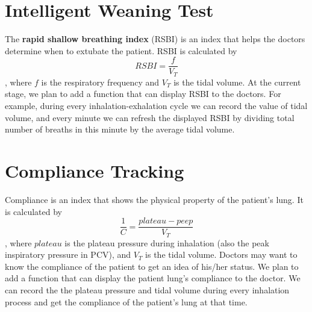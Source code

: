 \documentclass{article}
\begin{document}
\section{Intelligent Weaning Test}
The \textbf{rapid shallow breathing index} (RSBI) is an index that helps the doctors determine when to extubate the patient. RSBI is calculated by
$$RSBI=\frac{f}{V_T}$$, where $f$ is the respiratory frequency and $V_T$ is the tidal volume. At the current stage, we plan to add a function that can display RSBI to the doctors. For example, during every inhalation-exhalation cycle we can record the value of tidal volume, and every minute we can refresh the displayed RSBI by dividing total number of breaths in this minute by the average tidal volume.

\section{Compliance Tracking}
Compliance is an index that shows the physical property of the patient's lung. It is calculated by
$$\frac{1}{C}=\frac{plateau-peep}{V_T}$$, where $plateau$ is the plateau pressure during inhalation (also the peak inspiratory pressure in PCV), and $V_T$ is the tidal volume. Doctors may want to know the compliance of the patient to get an idea of his/her status. We plan to add a function that can display the patient lung's compliance to the doctor. We can record the the plateau pressure and tidal volume during every inhalation process and get the compliance of the patient's lung at that time.
\end{document}
